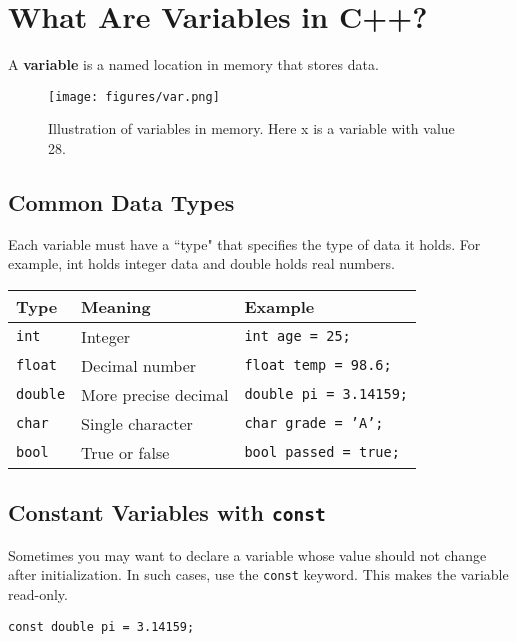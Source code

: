 \documentclass{article}
\begin{document}
\section{What Are Variables in C++?}

A \textbf{variable} is a named location in memory that stores data.



\begin{figure}[h]
    \centering
    \texttt{[image: figures/var.png]}  %
    \caption{Illustration of variables in memory. Here x is a variable with value 28.}
    \label{fig:var}
\end{figure}


\subsection*{Common Data Types}

Each variable must have a ``type" that specifies the type of data it holds. For example, int holds integer data and double holds real numbers.

\begin{center}
\begin{tabular}{|l|l|l|}
\hline
\textbf{Type} & \textbf{Meaning} & \textbf{Example} \\
\hline
\texttt{int} & Integer & \texttt{int age = 25;} \\
\texttt{float} & Decimal number & \texttt{float temp = 98.6;} \\
\texttt{double} & More precise decimal & \texttt{double pi = 3.14159;} \\
\texttt{char} & Single character & \texttt{char grade = 'A';} \\
\texttt{bool} & True or false & \texttt{bool passed = true;} \\
\hline
\end{tabular}
\end{center}

\subsection*{Constant Variables with \texttt{const}}

Sometimes you may want to declare a variable whose value should not change after initialization. In such cases, use the \texttt{const} keyword. This makes the variable read-only.

\begin{lstlisting}[style=cppstyle]
const double pi = 3.14159;
\end{lstlisting}
\end{document}
